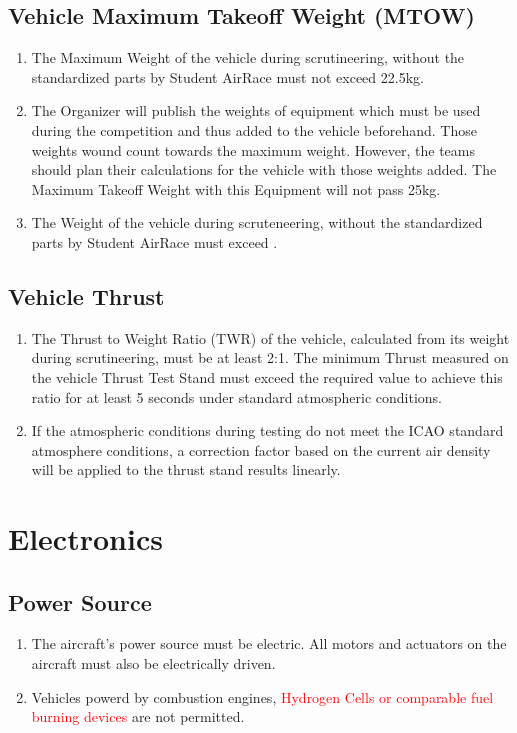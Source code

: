 \documentclass{article}
\begin{document}
\subsection{Vehicle Maximum Takeoff Weight (MTOW)}
\begin{enumerate}
  \item The Maximum Weight of the vehicle during scrutineering, without the standardized parts by Student AirRace must not exceed 22.5kg.
  \item The Organizer will publish the weights of equipment which must be used during the competition and thus added to the vehicle beforehand. Those weights wound count towards the maximum weight. 
  However, the teams should plan their calculations for the vehicle with those weights added. The Maximum Takeoff Weight with this Equipment will not pass 25kg.  
  \item The Weight of the vehicle during scruteneering, without the standardized parts by Student AirRace must exceed .  
\end{enumerate}

\subsection{Vehicle Thrust}
\begin{enumerate}
  \item The Thrust to Weight Ratio (TWR) of the vehicle, calculated from its weight during scrutineering, must be at least 2:1. The minimum Thrust measured on the vehicle Thrust Test Stand must exceed the required value to achieve this ratio for at least 5 seconds under standard atmospheric conditions.
  \item If the atmospheric conditions during testing do not meet the ICAO standard atmosphere conditions, a correction factor based on the current air density will be applied to the thrust stand results linearly.
\end{enumerate}


\section{Electronics}


\subsection{Power Source}
\begin{enumerate}
  \item The aircraft's power source must be electric. All motors and actuators on the aircraft must also be electrically driven.
  \item Vehicles powerd by combustion engines, \textcolor{red}{Hydrogen Cells or comparable fuel burning devices} are not permitted. 
\end{enumerate}
\end{document}

